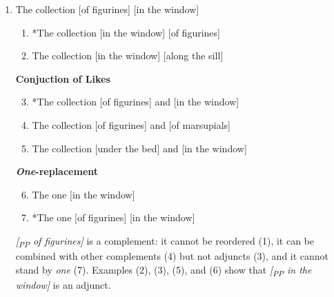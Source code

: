 \documentclass[12pt,letterpaper]{article}
\newcommand{\qtl}[1]{\strut #1}
\newcommand{\ppb}[1]{\emph{[\textsubscript{PP} #1]}}
\begin{document}
\begin{enumerate}[label=\alph*)]
	\item The collection [of figurines] [in the window]
	\par\vspace*{0.5ex}
	\begin{minipage}[c]{0.58\textwidth}
		\par\vspace{0.5ex}{\small\bfseries Reordering}
		\begin{enumerate}[label=(\arabic*),nosep]
			\item *The collection [in the window] [of figurines]
			\item The collection [in the window] [along the sill]
		\end{enumerate}
		{\small\bfseries Conjuction of Likes}
		\begin{enumerate}[label=(\arabic*),nosep]
			\setcounter{enumii}{2}
			\item *The collection [of figurines] and [in the window]
			\item The collection [of figurines] and [of marsupials]
			\item The collection [under the bed] and [in the window]
		\end{enumerate}
		{\small\bfseries \emph{One}-replacement}
		\begin{enumerate}[label=(\arabic*),nosep]
			\setcounter{enumii}{5}
			\item The one [in the window]
			\item *The one [of figurines] [in the window]
		\end{enumerate}
	\end{minipage}\hfill\begin{minipage}[c]{0.32\textwidth}
		\hfill{}
	\end{minipage}

	\par\vspace*{2ex}
	\ppb{of figurines} is a complement: it cannot be reordered (1), it can be combined with
	other complements (4) but not adjuncts (3), and it cannot stand by \emph{one} (7). Examples
	(2), (3), (5), and (6) show that \ppb{in the window} is an adjunct.
\end{enumerate}
\end{document}
